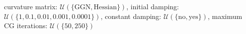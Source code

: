 curvature matrix: $\mathcal{U}(\{\text{GGN},\text{Hessian}\})$, initial damping: $\mathcal{U}(\{\num[scientific-notation=false]{1},\num[scientific-notation=true]{0.1},\num[scientific-notation=true]{0.01},\num[scientific-notation=true]{0.001},\num[scientific-notation=true]{0.0001}\})$, constant damping: $\mathcal{U}(\{\text{no},\text{yes}\})$, maximum CG iterations: $\mathcal{U}(\{\num[scientific-notation=false]{50},\num[scientific-notation=false]{250}\})$